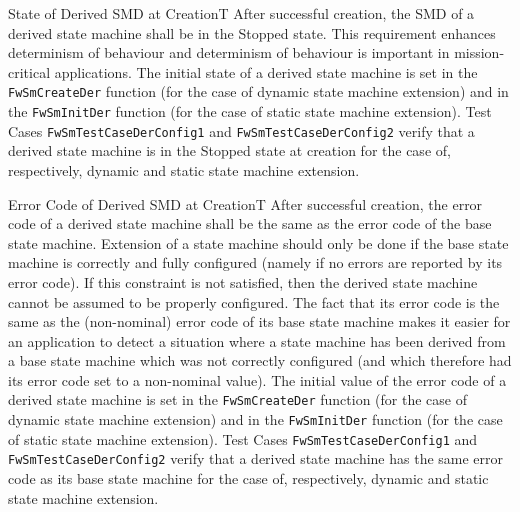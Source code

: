 \documentclass[a4paper,10pt]{article}
\newenvironment{fw_req}[6]
{\addtocounter{subsubsection}{1}
	\hspace{0.2cm}\textbf{FW-\arabic{section}.\arabic{subsection}.\arabic{subsubsection}/#2
	\hspace{0.8cm} #1}
	\vspace{-10pt}
\begin{longtable}{p{2.7cm}P{8.5cm}}
\hline
\textsc{Requirement} & #3 \\
\textsc{Justification} & #4 \\
\textsc{Implementation} & #5  \\ 
\textsc{Verification} & #6  \\
\hline
}
{\end{longtable}}
\begin{document}
\begin{fw_req}{State of Derived SMD at Creation}{T}
{After successful creation, the SMD of a derived state machine shall 
be in the Stopped state.}
{This requirement enhances determinism of behaviour and determinism 
of behaviour is important in mission-critical applications.}
{The initial state of a derived state machine is set in the 
\texttt{FwSmCreateDer} function (for the case of dynamic state machine extension) and in 
the \texttt{FwSmInitDer} function (for the case of static state machine extension).} 
{Test Cases \texttt{FwSmTestCaseDerConfig1} and 
\texttt{FwSmTestCaseDerConfig2} verify that a derived state machine is in the Stopped state 
at creation for the case of, respectively, dynamic and static state machine extension.}
\end{fw_req}


\begin{fw_req}{Error Code of Derived SMD at Creation}{T}
{After successful creation, the error code of a derived state machine 
shall be the same as the error code of the base state machine.}
{Extension of a state machine should only be done if the base state 
machine is correctly and fully configured (namely if no errors are reported by its error code). 
If this constraint is not satisfied, then the derived state machine cannot be assumed to be 
properly configured. 
The fact that its error code is the same as the (non-nominal) error code of its base state 
machine makes it easier for an application to detect a situation where a state machine has
been derived from a base state machine which was not correctly configured (and which therefore
had its error code set to a non-nominal value).}
{The initial value of the error code of a derived state machine is 
set in the \texttt{FwSmCreateDer} function (for the case of dynamic state machine extension) 
and in the \texttt{FwSmInitDer} function (for the case of static state machine extension).} 
{Test Cases \texttt{FwSmTestCaseDerConfig1} and 
\texttt{FwSmTestCaseDerConfig2} verify that a derived state machine has the same error code 
as its base state machine for the case of, respectively, dynamic and static state machine 
extension.}
\end{fw_req}
\end{document}
